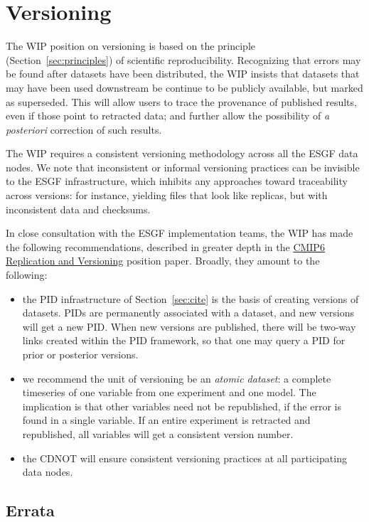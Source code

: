 \documentclass[gmd,manuscript]{copernicus}
\newcommand{\secref}[1] {\mbox{Section  \ref{sec:#1}}}
\begin{document}
\section{Versioning}
\label{sec:version}


The WIP position on versioning is based on the principle
(\secref{principles}) of scientific reproducibility. Recognizing that
errors may be found after datasets have been distributed, the WIP
insists that datasets that may have been used downstream be continue
to be publicly available, but marked as superseded. This will allow
users to trace the provenance of published results, even if those
point to retracted data; and further allow the possibility of \emph{a
  posteriori} correction of such results.

The WIP requires a consistent versioning methodology across all the
ESGF data nodes. We note that inconsistent or informal versioning
practices can be invisible to the ESGF infrastructure, which inhibits
any approaches toward traceability across versions: for instance,
yielding files that look like replicas, but with inconsistent data and
checksums.

In close consultation with the ESGF implementation teams, the WIP has
made the following recommendations, described in greater depth in the
\href{https://goo.gl/jqWjQ5}{CMIP6 Replication and Versioning}
position paper. Broadly, they amount to the following:

\begin{itemize}
\item the PID infrastructure of \secref{cite} is the basis of creating
  versions of datasets. PIDs are permanently associated with a
  dataset, and new versions will get a new PID. When new versions are
  published, there will be two-way links created within the PID
  framework, so that one may query a PID for prior or posterior versions.
\item we recommend the unit of versioning be an \emph{atomic dataset}:
  a complete timeseries of one variable from one experiment and one
  model. The implication is that other variables need not be
  republished, if the error is found in a single variable. If an
  entire experiment is retracted and republished, all variables will
  get a consistent version number.
\item the CDNOT will ensure consistent versioning practices at all
  participating data nodes.
\end{itemize}


\subsection{Errata}
\label{sec:errata}
\end{document}
